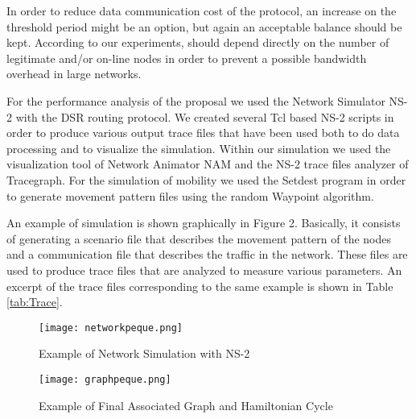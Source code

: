 \documentclass[conference]{IEEEtran}
\begin{document}
In order to reduce  data communication cost of the protocol, an
increase on the threshold period  might be an option, but again
an acceptable balance should be kept. According to our
experiments,  should depend directly on the number of
legitimate and/or on-line nodes in order to prevent a possible
bandwidth overhead in large networks.

For the performance analysis of the proposal we used the Network 
Simulator NS-2 with the DSR routing protocol.  We created several Tcl
based NS-2 scripts in order to produce various output trace files
that have been used both to do data processing and to visualize
the simulation. Within our simulation we  used the visualization
tool of Network Animator NAM  and the NS-2 trace files analyzer of
Tracegraph. For the simulation of mobility we used the Setdest
program in order to generate movement pattern files using the
random Waypoint algorithm.

An example of simulation is shown graphically in Figure
2. Basically, it consists of generating a scenario file that
describes the movement pattern of the nodes and a communication
file that describes the traffic in the network. These files are
used to produce trace files that are analyzed to measure various
parameters. An excerpt of the trace files corresponding to the
same example is shown in Table \ref{tab:Trace}.

\begin{figure*}[htb]
  \centering
     \texttt{[image: networkpeque.png]}
  \caption{Example of Network Simulation with NS-2}
  \label{fig:NS}
\end{figure*}


\begin{figure*}[htb]
  \centering
     \texttt{[image: graphpeque.png]}
  \caption{Example of Final Associated Graph and Hamiltonian Cycle} \label{fig:Graph}
  \vspace{-0.2cm}
\end{figure*}
\end{document}
